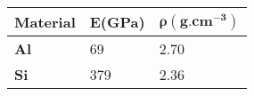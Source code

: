 \begin{tabular}{| m{7em} | m{7em} | m{7em} |}
    \hline
    \textbf{Material} & \textbf{E(GPa)} & $\mathbf{\rho (g.cm^{-3})}$\\
    \hline
    \textbf{Al} & 69 & 2.70\\
    \hline
    \textbf{Si} & 379 & 2.36\\
    \hline
    
\end{tabular}